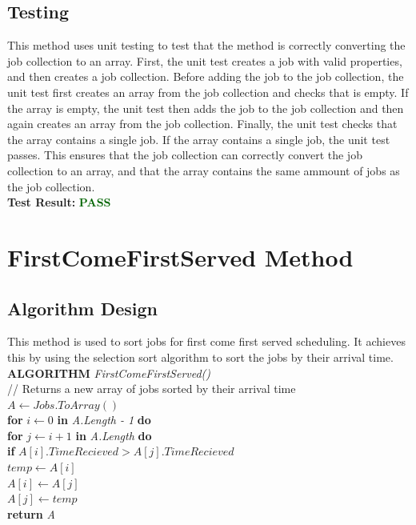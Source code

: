 \documentclass[12pt,a4paper]{article}
\begin{document}
		\subsection{Testing}
			This method uses unit testing to test that the method is correctly converting the job 
			collection to an array. First, the unit test creates a job with valid properties, and 
			then creates a job collection. Before adding the job to the job collection, 
			the unit test first creates an array from the job collection and checks that is empty. 
			If the array is empty, the unit test then adds the job to the job collection and 
			then again creates an array from the job collection. Finally, the unit test checks that 
			the array contains a single job. If the array contains a single job, the unit test passes. 
			This ensures that the job collection can correctly convert the job collection to an array, and 
			that the array contains the same ammount of jobs as the job collection.\\

			\textbf{Test Result:} \textbf{\textcolor{darkgreen}{PASS}}\\

	\newpage
	
	\section{FirstComeFirstServed Method}
		\subsection{Algorithm Design}
			This method is used to sort jobs for first come first served scheduling. It achieves 
			this by using the selection sort algorithm to sort the jobs by their arrival time.\\

			\textbf{ALGORITHM} \textit{FirstComeFirstServed()}\\
			\null\hspace{1cm}// Returns a new array of jobs sorted by their arrival time\\
			\null\hspace{1cm}\textit{$A \gets Jobs.ToArray()$}\\
			\null\hspace{1cm}\textbf{for} \textit{$i \gets 0$} \textbf{in} \textit{A.Length - 1} \textbf{do}\\
			\null\hspace{2cm}\textbf{for} \textit{$j \gets i + 1$} \textbf{in} \textit{A.Length} \textbf{do}\\
			\null\hspace{3cm}\textbf{if} \textit{$A[i].TimeRecieved > A[j].TimeRecieved$}\\
			\null\hspace{4cm}\textit{$temp \gets A[i]$}\\
			\null\hspace{4cm}\textit{$A[i] \gets A[j]$}\\
			\null\hspace{4cm}\textit{$A[j] \gets temp$}\\
			\null\hspace{1cm}\textbf{return} \textit{A}\\
		
\end{document}
